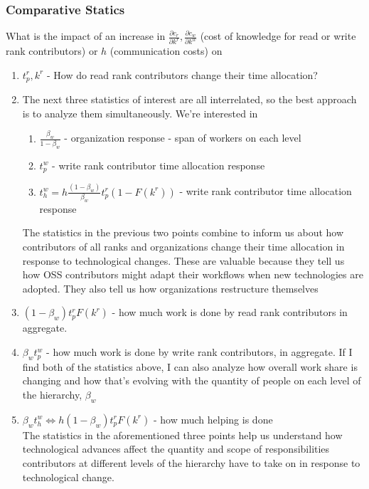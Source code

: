 \documentclass[source/paper/main.tex]{subfiles}
\begin{document}
\subsubsection{Comparative Statics}
What is the impact of an increase in $\frac{\partial c_r}{\partial k^r}, \frac{\partial c_w}{\partial k^w}$ (cost of knowledge for read or write rank contributors) or $h$ (communication costs) on
\begin{enumerate}
    \item $t_p^r, k^r$ - How do read rank contributors change their time allocation?
    \item The next three statistics of interest are all interrelated, so the best approach is to analyze them simultaneously. We're interested in
    \begin{enumerate}
        \item $\frac{\beta_w}{1-\beta_w}$ - organization response - span of workers on each level
        \item $t_p^w$ - write rank contributor time allocation response
        \item $t_h^w = h \frac{(1-\beta_w)}{\beta_w} t_p^r(1-F(k^r))$ - write rank contributor time allocation response
    \end{enumerate}
    The statistics in the previous two points combine to inform us about how contributors of all ranks and organizations change their time allocation in response to technological changes. These are valuable because they tell us how OSS contributors might adapt their workflows when new technologies are adopted. They also tell us how organizations restructure themselves 
    
    \item $(1-\beta_w) t_p^r F(k^r)$ - how much work is done by read rank contributors in aggregate. 
    \item $\beta_w t_p^w$ - how much work is done by write rank contributors, in aggregate. If I find both of the statistics above, I can also analyze how overall work share is changing and how that's evolving with the quantity of people on each level of the hierarchy, $\beta_w$
    \item $\beta_w t_h^w \iff h (1-\beta_w) t_p^rF(k^r)$ - how much helping is done \\
    The statistics in the aforementioned three points help us understand how technological advances affect the quantity and scope of responsibilities contributors at different levels of the hierarchy have to take on in response to technological change. 
\end{enumerate}
\newpage
\end{document}
